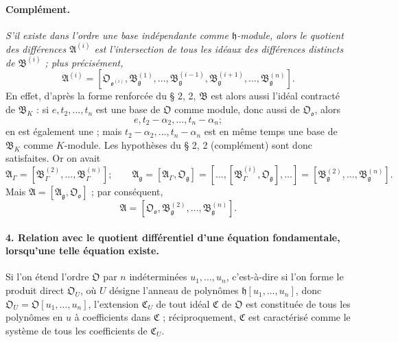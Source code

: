\paragraph{Complément.}
\emph{S'il existe dans l'ordre une base indépendante comme $\mathfrak h$-module, alors le quotient des différences $\mathfrak A^{(i)}$ est l'intersection de tous les idéaux des différences distincts de $\mathfrak B^{(i)}$ ; plus précisément,}
\[
\mathfrak A^{(i)}=
[\mathfrak O_{\mathfrak o^{(i)}},
\mathfrak B_{\mathfrak g}^{(1)},\ldots,
\mathfrak B_{\mathfrak g}^{(i-1)},
\mathfrak B_{\mathfrak g}^{(i+1)},\ldots,
\mathfrak B_{\mathfrak g}^{(n)}].
\]
En effet, d'après la forme renforcée du \S{} 2, 2, $\mathfrak B$ est alors aussi l'idéal contracté de $\mathfrak B_K$ : si $e,t_2,\ldots,t_n$ est une base de $\mathfrak O$ comme module, donc aussi de $\mathfrak O_{\mathfrak o}$, alors
\[
e,t_2-\alpha_2,\ldots,t_n-\alpha_n;
\]
en est également une ; mais $t_2-\alpha_2,\ldots,t_n-\alpha_n$ est en même temps une base de $\mathfrak B_K$ comme $K$-module. Les hypothèses du \S{} 2, 2 (complément) sont donc satisfaites. Or on avait
\[
\mathfrak A_\Gamma=[\mathfrak B_\Gamma^{(2)},\ldots,\mathfrak B_\Gamma^{(n)}];
\qquad
\mathfrak A_\mathfrak g=[\mathfrak A_\Gamma,\mathfrak O_\mathfrak g]
=[\ldots,[\mathfrak B_\Gamma^{(i)},\mathfrak O_\mathfrak g],\ldots]
=[\mathfrak B_\mathfrak g^{(2)},\ldots,\mathfrak B_\mathfrak g^{(n)}].
\]
Mais $\mathfrak A=[\mathfrak A_\mathfrak g,\mathfrak O_{\mathfrak o}]$ ; par conséquent,
\[
\mathfrak A=[\mathfrak O_{\mathfrak o},\mathfrak B_\mathfrak g^{(2)},\ldots,\mathfrak B_\mathfrak g^{(n)}].
\]

\paragraph{4. Relation avec le quotient différentiel d'une équation fondamentale, lorsqu'une telle équation existe.}
Si l'on étend l'ordre $\mathfrak O$ par $n$ indéterminées $u_1,\ldots,u_n$, c'est-à-dire si l'on forme le produit direct $\mathfrak O_U$, où $U$ désigne l'anneau de polynômes $\mathfrak h[u_1,\ldots,u_n]$, donc $\mathfrak O_U=\mathfrak O[u_1,\ldots,u_n]$, l'extension $\mathfrak C_U$ de tout idéal $\mathfrak C$ de $\mathfrak O$ est constituée de tous les polynômes en $u$ à coefficients dans $\mathfrak C$ ; réciproquement, $\mathfrak C$ est caractérisé comme le système de tous les coefficients de $\mathfrak C_U$.

